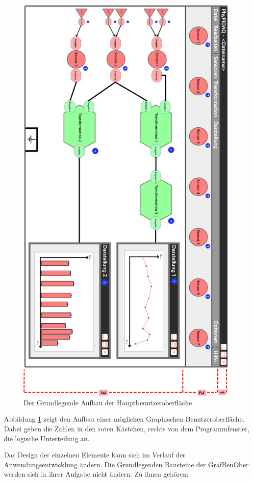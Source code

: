 \documentclass[parskip=full]{scrartcl}
\begin{document}
\begin{figure}[htbp]
	\begin{center}
		\includegraphics[width = 11cm]{Grafik/Konkreter-Anwendungsfall}
		\caption{Der Grundlegende Aufbau der Hauptbenutzeroberfläche}
		\label{GUI_Grundlage}
	\end{center}
\end{figure}

Abbildung \ref{GUI_Grundlage} zeigt den Aufbau einer möglichen Graphischen Benutzeroberfläche. Dabei geben die Zahlen in den roten Kästchen, rechts von dem Programmfenster, die logische Unterteilung an.

Das Design der einzelnen Elemente kann sich im Verlauf der Anwendungsentwicklung ändern. Die Grundlegenden Bausteine der \gls{GrafBenOber} werden sich in ihrer Aufgabe nicht ändern. Zu ihnen gehören:
\end{document}
